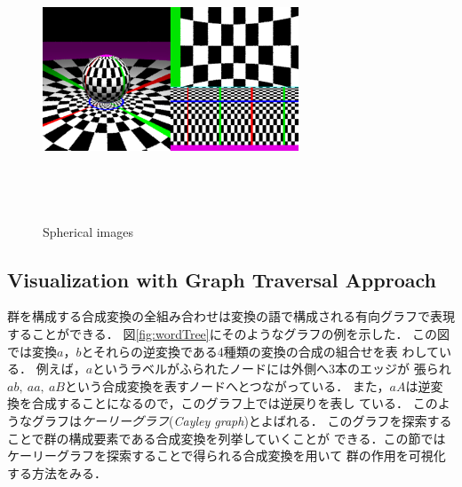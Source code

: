 \begin{figure}[htbp]
\begin{minipage}{0.5\hsize}
  \label{fig:sphericalTranslation}
 \end{minipage}
 \begin{minipage}{0.5\hsize}
  \center
  \includegraphics[width=3in, height=3in, keepaspectratio]{../img/klein/sphericalScaling.pdf}
  \label{fig:sphericalScaling}
 \end{minipage}
 \caption{Spherical images}
 \label{fig:spherical}
\end{figure}

\subsection{Visualization with Graph Traversal Approach}

群を構成する合成変換の全組み合わせは変換の語で構成される有向グラフで表現
することができる．
図\ref{fig:wordTree}にそのようなグラフの例を示した．
この図では変換$a$，$b$とそれらの逆変換である4種類の変換の合成の組合せを表
わしている．
例えば，$a$というラベルがふられたノードには外側へ3本のエッジが
張られ$ab,~aa,~aB$という合成変換を表すノードへとつながっている．
また，$aA$は逆変換を合成することになるので，このグラフ上では逆戻りを表し
ている．
このようなグラフは\emph{ケーリーグラフ}(\textit{Cayley graph})とよばれる．
このグラフを探索することで群の構成要素である合成変換を列挙していくことが
できる．この節ではケーリーグラフを探索することで得られる合成変換を用いて
群の作用を可視化する方法をみる．


